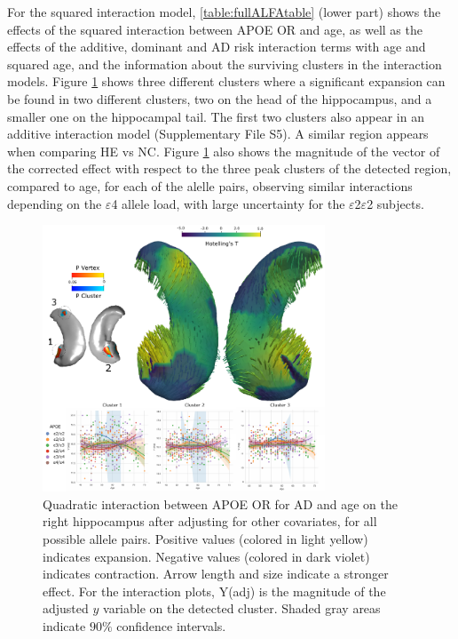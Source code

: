 For the squared interaction model, \ref{table:fullALFAtable} (lower part) shows the effects of the squared interaction between APOE OR and age, as well as the effects of the additive,  dominant and AD risk interaction terms with age and squared age, and the information about the surviving clusters in the interaction models. Figure \ref{fig:alfainteractionfig2} shows three different clusters where a significant expansion can be found in two different clusters, two on the head of the hippocampus, and a smaller one on the hippocampal tail. The first two clusters also appear in an additive interaction model (Supplementary File S5). A similar region appears when comparing HE vs NC. Figure \ref{fig:alfainteractionfig2} also shows the magnitude of the vector of the corrected effect with respect to the three peak clusters of the detected region, compared to age, for each of the alelle pairs, observing similar interactions depending on the $\varepsilon$4 allele load, with large uncertainty for the $\varepsilon$2$\varepsilon$2 subjects. \\

\begin{figure}[htbp]
  \centering
  \includegraphics[width=0.75\textwidth]{figures/hippocampus/fig_interactionapoealfa_OR.pdf}
  \caption[Quadratic interaction between APOE OR for AD and age on the right hippocampus.]{Quadratic interaction between APOE OR for AD and age on the right hippocampus after adjusting for other covariates, for all possible allele pairs. Positive values (colored in light yellow) indicates expansion. Negative values (colored in dark violet) indicates contraction. Arrow length and size indicate a stronger effect. For the interaction plots, Y(adj) is the magnitude of the adjusted $y$ variable on the detected cluster. Shaded gray areas indicate $90\%$ confidence intervals.}\label{fig:alfainteractionfig2}
\end{figure}

